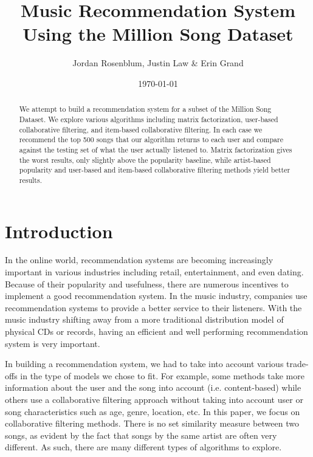 \documentclass[12pt,preprint]{aastex}
\begin{document}
\title{Music Recommendation System Using the Million Song Dataset}

 \author{Jordan Rosenblum, Justin Law \& Erin Grand}
 
\date{\today}             

\begin{abstract}
We attempt to build a recommendation system for a subset of the Million Song Dataset. We explore various algorithms including matrix factorization, user-based collaborative filtering, and item-based collaborative filtering. In each case we recommend the top 500 songs that our algorithm returns to each user and compare against the testing set of what the user actually listened to. Matrix factorization gives the worst results, only slightly above the popularity baseline, while artist-based popularity and user-based and item-based collaborative filtering methods yield better results.
\end{abstract}

\tableofcontents

\section{Introduction}
In the online world, recommendation systems are becoming increasingly important in various industries including retail, entertainment, and even dating. 
Because of their popularity and usefulness, there are numerous incentives to implement a good recommendation system. 
In the music industry, companies use recommendation systems to provide a better service to their listeners. 
With the music industry shifting away from a more traditional distribution model of physical CDs or records, 
having an efficient and well performing recommendation system is very important. 

In building a recommendation system, we had to take into account various trade-offs in the type of models we chose to fit. For example, some methods take more information about the user and the song into account (i.e. content-based) while others use a collaborative filtering approach without taking into account user or song characteristics such as age, genre, location, etc. In this paper, we focus on collaborative filtering methods.
There is no set similarity measure between two songs, as evident by the fact that songs by the same artist are often very different. As such, there are many different types of algorithms to explore. 
\end{document}
